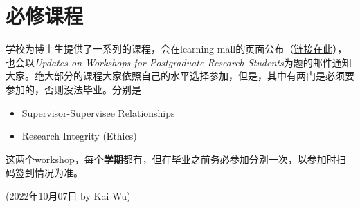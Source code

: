 \section{必修课程}
学校为博士生提供了一系列的课程，会在learning mall的页面公布（\href{https://core.xjtlu.edu.cn/course/view.php?id=847}{链接在此}），也会以\textit{Updates on Workshops for Postgraduate Research Students}为题的邮件通知大家。绝大部分的课程大家依照自己的水平选择参加，但是，其中有两门是必须要参加的，否则没法毕业。分别是

\begin{itemize}
    \item Supervisor-Supervisee Relationships
    \item Research Integrity (Ethics)
\end{itemize}

这两个workshop，每个\textbf{学期}都有，但在毕业之前务必参加分别一次，以参加时扫码签到情况为准。

\begin{flushright}
(2022年10月07日 by Kai Wu)
\end{flushright}
